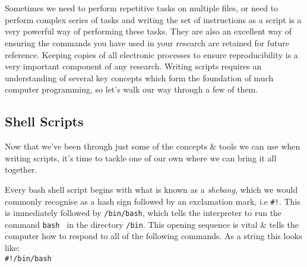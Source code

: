 
\chapter{\moduleTitle}
\newpage

Sometimes we need to perform repetitive tasks on multiple files, or need to perform complex series of tasks and writing the set of instructions as a script is a very powerful way of performing these tasks.
They are also an excellent way of ensuring the commands you have used in your research are retained for future reference.
Keeping copies of all electronic processes to ensure reproducibility is a very important component of any research. 
Writing scripts requires an understanding of several key concepts which form the foundation of much computer programming, so let's walk our way through a few of them. \\


\section{Shell Scripts}
Now that we've been through just some of the concepts \& tools we can use when writing scripts, it's time to tackle one of our own where we can bring it all together.

\begin{information}
Every bash shell script begins with what is known as a \textit{shebang}, which we would commonly recognise as a hash sign followed by an exclamation mark, i.e \texttt{\#!}.
This is immediately followed by \texttt{/bin/bash}, which tells the interpreter to run the command \texttt{bash } in the directory \texttt{/bin}.
This opening sequence is vital \& tells the computer how to respond to all of the following commands.
As a string this looks like:\\

\texttt{\#!/bin/bash}\\
\end{information}

